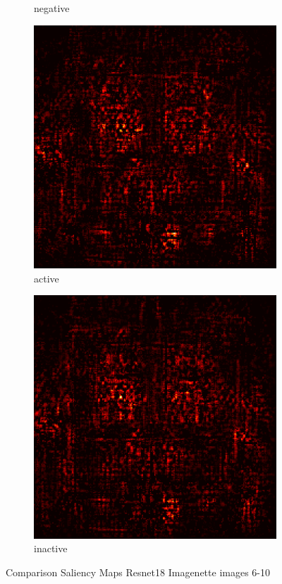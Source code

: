 \documentclass[preprint,12pt]{elsarticle}
\begin{document}
\begin{figure}
\begin{subfigure}{0.14\textwidth}
        \caption{negative}
    \end{subfigure}
    \hfill
    \begin{subfigure}{0.14\textwidth}
        \centering
        \includegraphics[width=\linewidth]{../visualizations/examples/imagenette/resnet18/active_saliency_map/9.png}
        \caption{active}
    \end{subfigure}
    \hfill
    \begin{subfigure}{0.14\textwidth}
        \centering
        \includegraphics[width=\linewidth]{../visualizations/examples/imagenette/resnet18/inactive_saliency_map/9.png}
        \caption{inactive}
    \end{subfigure}
    \hfill
    \caption{Comparison Saliency Maps Resnet18 Imagenette images 6-10}
\end{figure}
\end{document}
